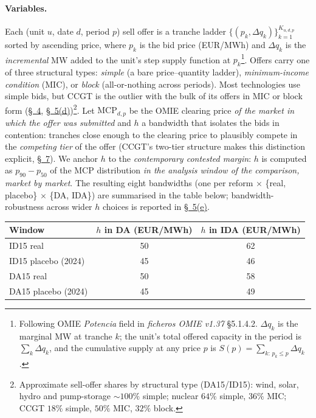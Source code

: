 \documentclass[11pt]{article}
\begin{document}
\paragraph{Variables.} Each (unit $u$, date $d$, period $p$) sell offer is a tranche ladder $\{(p_k, \Delta q_k)\}_{k=1}^{K_{u,d,p}}$ sorted by ascending price, where $p_k$ is the bid price (EUR/MWh) and $\Delta q_k$ is the \emph{incremental} MW added to the unit's step supply function at $p_k$\footnote{Following OMIE \emph{Potencia} field in \textit{ficheros OMIE v1.37} \S 5.1.4.2. $\Delta q_k$ is the marginal MW at tranche $k$; the unit's total offered capacity in the period is $\sum_k \Delta q_k$, and the cumulative supply at any price $p$ is $S(p)=\sum_{k:\,p_k\le p}\Delta q_k$.}. Offers carry one of three structural types: \emph{simple} (a bare price--quantity ladder), \emph{minimum-income condition} (MIC), or \emph{block} (all-or-nothing across periods). Most technologies use simple bids, but CCGT is the outlier with the bulk of its offers in MIC or block form (\hyperref[sec:results]{\S~4}, \hyperref[sec:5d]{\S~5(d)})\footnote{Approximate sell-offer shares by structural type (DA15/ID15): wind, solar, hydro and pump-storage $\sim\!100\%$ simple; nuclear $64\%$ simple, $36\%$ MIC; CCGT $18\%$ simple, $50\%$ MIC, $32\%$ block.}. Let $\text{MCP}_{d,p}$ be the OMIE clearing price \emph{of the market in which the offer was submitted} and $h$ a bandwidth that isolates the bids in contention: tranches close enough to the clearing price to plausibly compete in the \emph{competing tier} of the offer (CCGT's two-tier structure makes this distinction explicit, \hyperref[sec:context]{\S~7}). We anchor $h$ to the \emph{contemporary contested margin}: $h$ is computed as $p_{90}-p_{50}$ of the MCP distribution \emph{in the analysis window of the comparison, market by market}. The resulting eight bandwidths (one per reform $\times$ \{real, placebo\} $\times$ \{DA, IDA\}) are summarised in the table below; bandwidth-robustness across wider $h$ choices is reported in \hyperref[sec:5e]{\S~5(e)}.
\begin{center}
\footnotesize
\setlength{\tabcolsep}{8pt}
\begin{tabular}{l c c}
\toprule
\textbf{Window} & $h$ in DA (EUR/MWh) & $h$ in IDA (EUR/MWh) \\
\midrule
ID15 real             & 50 & 62 \\
ID15 placebo (2024)   & 45 & 46 \\
DA15 real             & 50 & 58 \\
DA15 placebo (2024)   & 45 & 49 \\
\bottomrule
\end{tabular}
\end{center}
\end{document}
